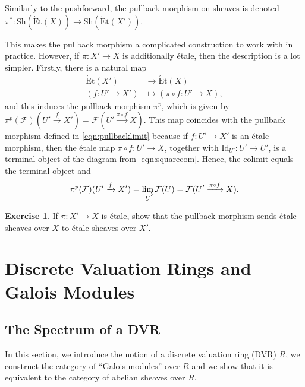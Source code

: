 \documentclass{article}
\newcommand{\Et}{\acute{\mathrm{E}}\mathrm{t}}
\newcommand{\Sh}{\mathrm{Sh}}
\newcommand{\Id}{\mathrm{Id}}
\theoremstyle{plain}
\theoremstyle{definition}
\newtheorem*{exercise}{Exercise}
\begin{document}
    Similarly to the pushforward, the pullback morphism on sheaves is denoted $\pi^*:\Sh(\Et(X))\rightarrow\Sh(\Et(X'))$.

    This makes the pullback morphism a complicated construction to work with in practice. However, if $\pi:X'\to X$ is additionally \'{e}tale, then the description is a lot simpler. Firstly, there is a natural map
    \begin{align*}
        \Et(X')&\longrightarrow\Et(X)\\
        (f:U'\to X')&\longmapsto(\pi\circ f:U'\to X),
    \end{align*}
    and this induces the pullback morphism $\pi^p$, which is given by $\pi^p(\mathcal{F})(U'\xrightarrow{f}X')=\mathcal{F}(U'\xrightarrow{\pi\circ f}X)$. This map coincides with the pullback morphism defined in \eqref{eqn:pullbacklimit} because if $f:U'\to X'$ is an \'{e}tale morphism, then the \'{e}tale map $\pi\circ f:U'\to X$, together with $\Id_{U'}:U'\to U'$, is a terminal object of the diagram from \eqref{eqn:squarecom}. Hence, the colimit equals the terminal object and
    $$\pi^p(\mathcal{F})(U'\xrightarrow{f}X')=\varinjlim_U\mathcal{F}(U)=\mathcal{F}(U'\xrightarrow{\pi\circ f}X).$$ 
    \begin{exercise}
        If $\pi:X'\to X$ is \'{e}tale, show that the pullback morphism sends \'{e}tale sheaves over $X$ to \'{e}tale sheaves over $X'$. 
    \end{exercise}

    \section{Discrete Valuation Rings and Galois Modules}
    \subsection{The Spectrum of a DVR}
    In this section, we introduce the notion of a discrete valuation ring (DVR) $R$, we construct the category of ``Galois modules'' over $R$ and we show that it is equivalent to the category of abelian sheaves over $R$.
\end{document}
